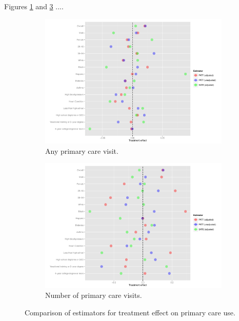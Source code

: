 \documentclass[12pt]{article}
\begin{document}
Figures \ref{fig:any-out-plot} and \ref{fig:num-out-plot}  ....

\begin{figure}
\begin{center}
     \begin{subfigure}[b]{0.86\textwidth}
    \includegraphics[width=\textwidth]{any-out-plot.pdf}
    \caption{Any primary care visit.}
    \label{fig:any-out-plot}
  \end{subfigure}
    \begin{subfigure}[b]{0.86\textwidth}
    \includegraphics[width=\textwidth]{num-out-plot.pdf}
    \caption{Number of primary care visits.}
    \label{fig:num-out-plot}
  \end{subfigure}
  \caption{Comparison of estimators for treatment effect on primary care use.}
   \end{center}
\end{figure}
\end{document}
